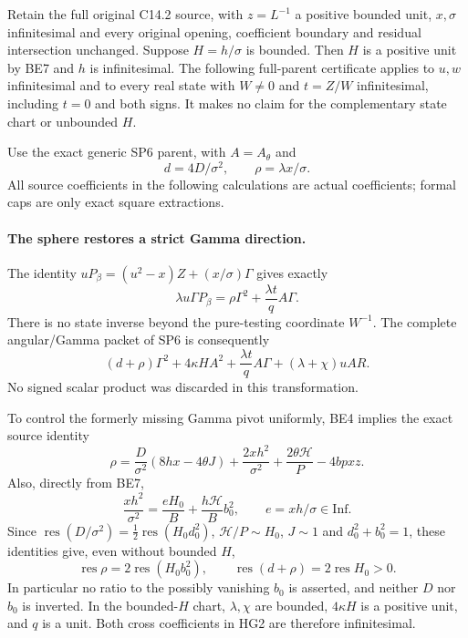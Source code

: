 \label{pcb3428d66a71:sec:r19-c142-bounded-H}

Retain the full original C14.2 source, with $z=L^{-1}$ a positive
bounded unit, $x,\sigma$ infinitesimal and every original opening,
coefficient boundary and residual intersection unchanged.  Suppose
$H=h/\sigma$ is bounded.  Then $H$ is a positive unit by BE7 and
$h$ is infinitesimal.  The following full-parent certificate applies
to $u,w$ infinitesimal and to every real state with $W\ne0$ and
$t=Z/W$ infinitesimal, including $t=0$ and both signs.  It makes
no claim for the complementary state chart or unbounded $H$.

Use the exact generic SP6 parent, with $A=A_\theta$ and
\[
 d=4D/\sigma^2,\qquad \rho=\lambda x/\sigma.
\]
All source coefficients in the following calculations are actual
coefficients; formal caps are only exact square extractions.

\paragraph{The sphere restores a strict Gamma direction.}
The identity $uP_\beta=(u^2-x)Z+(x/\sigma)\Gamma$ gives exactly
\[
 \lambda u\Gamma P_\beta
       =\rho\Gamma^2+\frac{\lambda t}{q}A\Gamma.
 \tag{HG1}
\]
There is no state inverse beyond the pure-testing coordinate $W^{-1}$.
The complete angular/Gamma packet of SP6 is consequently
\[
 (d+\rho)\Gamma^2+4\kappa H A^2
       +\frac{\lambda t}{q}A\Gamma
       +(\lambda+\chi)uAR.
 \tag{HG2}
\]
No signed scalar product was discarded in this transformation.

To control the formerly missing Gamma pivot uniformly, BE4 implies
the exact source identity
\[
 \rho=\frac D{\sigma^2}(8hx-4\theta J)
       +\frac{2xh^2}{\sigma^2}
       +\frac{2\theta\mathcal H}{P}-4bp xz.
 \tag{HG3}
\]
Also, directly from BE7,
\[
 \frac{xh^2}{\sigma^2}
    =\frac{eH_0}{B}+\frac{h\mathcal H}{B}b_0^2,
 \qquad e=xh/\sigma\in\mathrm{Inf}.
 \tag{HG4}
\]
Since $\operatorname{res}(D/\sigma^2)=
\tfrac12\operatorname{res}(H_0d_0^2)$,
$\mathcal H/P\sim H_0$, $J\sim1$ and
$d_0^2+b_0^2=1$, these identities give, even without bounded $H$,
\[
 \operatorname{res}\rho=2\operatorname{res}(H_0b_0^2),\qquad
 \operatorname{res}(d+\rho)=2\operatorname{res}H_0>0.
 \tag{HG5}
\]
In particular no ratio to the possibly vanishing $b_0$ is asserted,
and neither $D$ nor $b_0$ is inverted.  In the bounded-$H$ chart,
$\lambda,\chi$ are bounded,
$4\kappa H$ is a positive unit, and $q$ is a unit.  Both cross
coefficients in HG2 are therefore infinitesimal.

